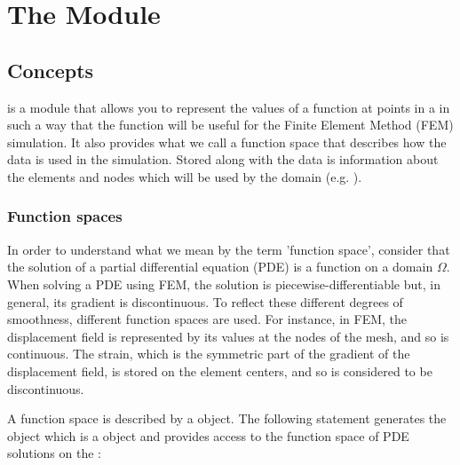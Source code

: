 
%
%
%

\chapter{The \escript Module}\label{ESCRIPT CHAP}

\section{Concepts}
\escript is a \PYTHON module that allows you to represent the values of
a function at points in a \Domain in such a way that the function will
be useful for the Finite Element Method (FEM) simulation. It also
provides what we call a function space that describes how the data is
used in the simulation. Stored along with the data is information
about the elements and nodes which will be used by the domain (e.g. \finley).

\subsection{Function spaces}
In order to understand what we mean by the term 'function space',
consider that the solution of a partial differential
equation (PDE) is a function on a domain
$\Omega$.  When solving a PDE using FEM, the solution is
piecewise-differentiable but, in general, its gradient is discontinuous.
To reflect these different degrees of smoothness, different function spaces
are used.
For instance, in FEM, the displacement field is represented by its values at
the nodes of the mesh, and so is continuous.
The strain, which is the symmetric part of the gradient of the displacement
field, is stored on the element centers, and so is considered to be
discontinuous.

A function space is described by a \FunctionSpace object.
The following statement generates the object  which is
a \FunctionSpace object and provides access to the function space of
PDE solutions on the \Domain {}:


